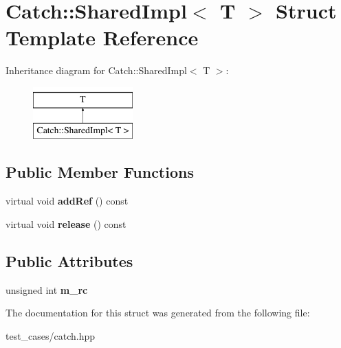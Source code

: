 \hypertarget{structCatch_1_1SharedImpl}{}\section{Catch\+:\+:Shared\+Impl$<$ T $>$ Struct Template Reference}
\label{structCatch_1_1SharedImpl}
Inheritance diagram for Catch\+:\+:Shared\+Impl$<$ T $>$\+:\begin{figure}[H]
\begin{center}
\leavevmode
\includegraphics[height=2.000000cm]{structCatch_1_1SharedImpl}
\end{center}
\end{figure}
\subsection*{Public Member Functions}
\begin{DoxyCompactItemize}
\item 
\mbox{\label{structCatch_1_1SharedImpl_a5d1a4c96e8fc07c821890fd09749062e}} 
virtual void {\bfseries add\+Ref} () const
\item 
\mbox{\label{structCatch_1_1SharedImpl_ada8052c6f24fd73ec099333626f106fe}} 
virtual void {\bfseries release} () const
\end{DoxyCompactItemize}
\subsection*{Public Attributes}
\begin{DoxyCompactItemize}
\item 
\mbox{\label{structCatch_1_1SharedImpl_a7e71ef1985b85aa41a1632f932a96bcb}} 
unsigned int {\bfseries m\+\_\+rc}
\end{DoxyCompactItemize}


The documentation for this struct was generated from the following file\+:\begin{DoxyCompactItemize}
\item 
test\+\_\+cases/catch.\+hpp\end{DoxyCompactItemize}
